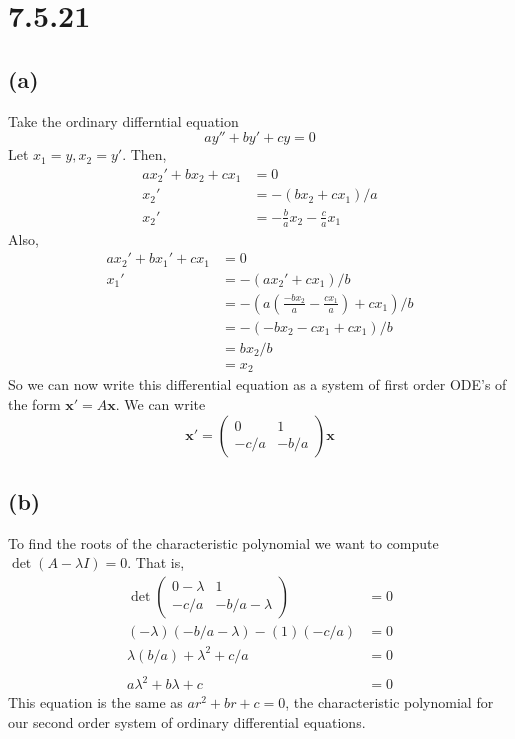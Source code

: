 \documentclass{article}
\theoremstyle{definition}
\begin{document}
\section*{7.5.21}
    \subsection*{(a)}
        Take the ordinary differntial equation 
        \[
            ay'' + by' + cy = 0
        \]
        Let $x_1 = y, x_2 = y'$.
        Then,
        \begin{align*}
            ax_2' + bx_2 + cx_1 &= 0\\
            x_2' &= -(bx_2 + cx_1)/a \\
            x_2' &= -\frac{b}{a}x_2 - \frac{c}{a}x_1
        \end{align*}
        Also,
        \begin{align*}
            ax_2' + bx_1' + cx_1 &= 0 \\
            x_1' &= -(ax_2' + cx_1)/b \\
            &= -(a(\frac{-bx_2}{a} - \frac{cx_1}{a}) + cx_1) / b \\
            &= -(-bx_2 - cx_1 + cx_1)/b \\
            &= bx_2 / b \\
            &= x_2
        \end{align*}
        So we can now write this differential equation as a system of first order ODE's of the form $\bm x' = A \bm x$. We can write 
        \[
            \bm x' = \begin{pmatrix}
                0 & 1 \\ -c/a & -b/a
            \end{pmatrix} \bm x
        \]
    \subsection*{(b)}
        To find the roots of the characteristic polynomial we want to compute $\det(A - \lambda I)=0$. That is,
        \begin{align*}
            \det \begin{pmatrix}
                0 - \lambda & 1 \\
                -c/a & -b/a - \lambda
            \end{pmatrix} &= 0\\
            (-\lambda)(-b/a - \lambda) - (1)(-c/a) &= 0\\
            \lambda(b/a) + \lambda^2 + c/a &= 0 \\\\
            a\lambda^2 + b\lambda + c &= 0
        \end{align*}
        This equation is the same as $ar^2 + br + c = 0$, the characteristic polynomial for our second order system 
        of ordinary differential equations.
\end{document}
